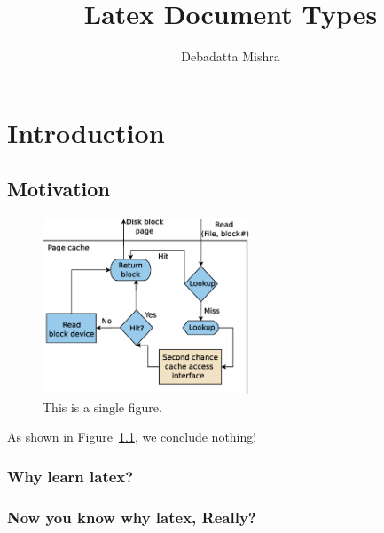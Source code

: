 \documentclass[a4paper, 10pt]{report}
\title{Latex Document Types}
\author{Debadatta Mishra}
\date{}
\begin{document}
\maketitle
\tableofcontents

\listoffigures

\listoftables
\begin{abstract}
\lipsum[30]
\end{abstract}    
\chapter{Introduction}
\lipsum[70]


\section{Motivation}

\begin{figure}
\centering
\includegraphics[width=0.55\textwidth]{cc_get.eps}
 \caption{This is a single figure.}
 \label{fig:cc_get}
\end{figure}

As shown in Figure~\ref{fig:cc_get}, we conclude nothing!
\lipsum[50]
\subsection{Why learn latex?}

\lipsum

\subsection{Now you know why latex, Really?}
\lipsum[50]

\lipsum[50]
\end{document}
